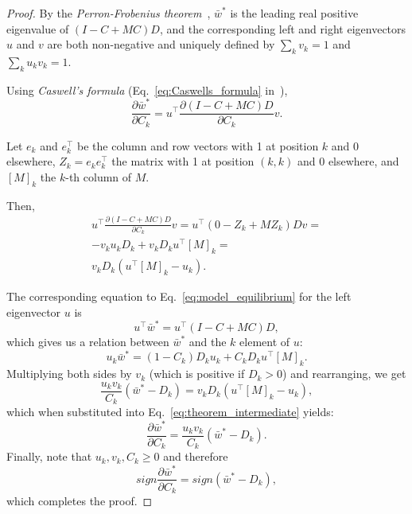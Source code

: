 \documentclass[9pt, a4paper, twocolumn]{extarticle}
\newcommand*{\tr}{^\intercal}
\begin{document}
\begin{proof}
By the \emph{Perron-Frobenius theorem}~\cite[Appendix~A]{Otto2007},
$\bar{w}^*$ is the leading real positive eigenvalue of $(I-C+MC)D$,
and the corresponding left and right eigenvectors $u$ and $v$ are both non-negative and uniquely defined by $\sum_k{v_k} = 1$ and $\sum_k{u_k v_k} = 1$.

Using \emph{Caswell's formula} (Eq.~\ref{eq:Caswells_formula} in~),
\begin{equation}
\frac{\partial \bar{w}^*}{\partial C_k} = 
u\tr \frac{\partial (I-C+MC)D}{\partial C_k} v.
\end{equation}

Let $e_k$ and $e\tr_k$ be the column and row vectors with 1 at position $k$ and 0 elsewhere, $Z_k = e_k e\tr_k$ the matrix with 1 at position $(k,k)$ and 0 elsewhere, and $[M]_k$ the $k$-th column of $M$.

Then,
\begin{equation}\label{eq:theorem_intermediate}
\begin{aligned}
u\tr \frac{\partial (I-C+MC)D}{\partial C_k} v = 
u\tr (0 - Z_k + M Z_k)D v = \\
-v_k u_k D_k + v_k D_k u\tr[M]_k = \\
v_k D_k (u\tr[M]_k - u_k). 
\end{aligned}
\end{equation}

The corresponding equation to Eq.~\ref{eq:model_equilibrium} for the left
eigenvector $u$ is 
\begin{equation}
u\tr \bar{w}^* = u\tr (I - C + MC) D,
\end{equation}
which gives us a relation between $\bar{w}^*$ and the $k$
element of $u$:
\begin{equation}
u_k \bar{w}^* = (1-C_k) D_k u_k + C_k D_k u\tr [M]_k.
\end{equation}
Multiplying both sides by $v_k$ (which is positive if $D_k>0$) and rearranging, we get 
\begin{equation}
\frac{u_k v_k}{C_k} (\bar{w}^* - D_k) = v_k D_k(u\tr [M]_k - u_k),
\end{equation}
which when substituted into Eq.~\ref{eq:theorem_intermediate} yields:
\begin{equation}
\frac{\partial \bar{w}^*}{\partial C_k} = 
\frac{u_k v_k}{C_k} (\bar{w}^* - D_k).
\end{equation}
Finally, note that $u_k, v_k, C_k \ge 0$ and therefore
\begin{equation}
sign \frac{\partial \bar{w}^*}{\partial C_k} = 
sign (\bar{w}^* - D_k),
\end{equation}
which completes the proof.
\end{proof}
\end{document}

